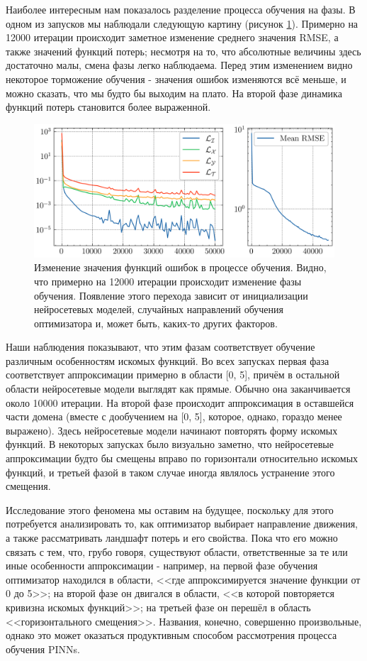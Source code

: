 \documentclass[a4paper, 12pt]{article}
\begin{document}
Наиболее интересным нам показалось разделение процесса обучения на фазы. В одном из запусков мы наблюдали следующую картину (рисунок \ref{fig:lotkavolterra:first:losses}). Примерно на 12000 итерации происходит заметное изменение среднего значения RMSE, а также значений функций потерь; несмотря на то, что абсолютные величины здесь достаточно малы, смена фазы легко наблюдаема. Перед этим изменением видно некоторое торможение обучения - значения ошибок изменяются всё меньше, и можно сказать, что мы будто бы выходим на плато. На второй фазе динамика функций потерь становится более выраженной.

\begin{figure}
    \centering
    \includegraphics{../images/lotkavolterra/first approach/Losses.png}
    \caption{Изменение значения функций ошибок в процессе обучения. Видно, что примерно на 12000 итерации происходит изменение фазы обучения. Появление этого перехода зависит от инициализации нейросетевых моделей, случайных направлений обучения оптимизатора и, может быть, каких-то других факторов.}
    \label{fig:lotkavolterra:first:losses}
\end{figure}

Наши наблюдения показывают, что этим фазам соответствует обучение различным особенностям искомых функций. Во всех запусках первая фаза соответствует аппроксимации примерно в области [0, 5], причём в остальной области нейросетевые модели выглядят как прямые. Обычно она заканчивается около 10000 итерации. На второй фазе происходит аппроксимация в оставшейся части домена (вместе с дообучением на [0, 5], которое, однако, гораздо менее выражено). Здесь нейросетевые модели начинают повторять форму искомых функций. В некоторых запусках было визуально заметно, что нейросетевые аппроксимации будто бы смещены вправо по горизонтали относительно искомых функций, и третьей фазой в таком случае иногда являлось устранение этого смещения.

Исследование этого феномена мы оставим на будущее, поскольку для этого потребуется анализировать то, как оптимизатор выбирает направление движения, а также рассматривать ландшафт потерь и его свойства. Пока что его можно связать с тем, что, грубо говоря, существуют области, ответственные за те или иные особенности аппроксимации - например, на первой фазе обучения оптимизатор находился в области, <<где аппроксимируется значение функции от 0 до 5>>; на второй фазе он двигался в области, <<в которой повторяется кривизна искомых функций>>; на третьей фазе он перешёл в область <<горизонтального смещения>>. Названия, конечно, совершенно произвольные, однако это может оказаться продуктивным способом рассмотрения процесса обучения PINNs.
\end{document}
